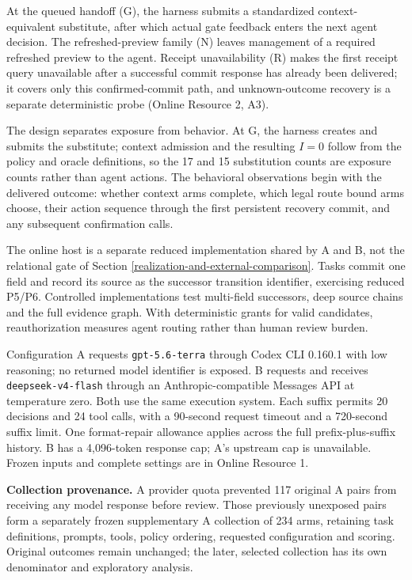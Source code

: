 At the queued handoff (G), the harness submits a standardized context-equivalent substitute, after which actual gate feedback enters the next agent decision. The refreshed-preview family (N) leaves management of a required refreshed preview to the agent. Receipt unavailability (R) makes the first receipt query unavailable after a successful commit response has already been delivered; it covers only this confirmed-commit path, and unknown-outcome recovery is a separate deterministic probe (Online Resource 2, A3).

The design separates exposure from behavior. At G, the harness creates and submits the substitute; context admission and the resulting \(I=0\) follow from the policy and oracle definitions, so the 17 and 15 substitution counts are exposure counts rather than agent actions. The behavioral observations begin with the delivered outcome: whether context arms complete, which legal route bound arms choose, their action sequence through the first persistent recovery commit, and any subsequent confirmation calls.

The online host is a separate reduced implementation shared by A and B, not the relational gate of Section \ref{realization-and-external-comparison}. Tasks commit one field and record its source as the successor transition identifier, exercising reduced P5/P6. Controlled implementations test multi-field successors, deep source chains and the full evidence graph. With deterministic grants for valid candidates, reauthorization measures agent routing rather than human review burden.

Configuration A requests \texttt{gpt-5.6-terra} through Codex CLI 0.160.1 with low reasoning; no returned model identifier is exposed. B requests and receives \texttt{deepseek-v4-flash} through an Anthropic-compatible Messages API at temperature zero. Both use the same execution system. Each suffix permits 20 decisions and 24 tool calls, with a 90-second request timeout and a 720-second suffix limit. One format-repair allowance applies across the full prefix-plus-suffix history. B has a 4,096-token response cap; A's upstream cap is unavailable. Frozen inputs and complete settings are in Online Resource 1.

\textbf{Collection provenance.} A provider quota prevented 117 original A pairs from receiving any model response before review. Those previously unexposed pairs form a separately frozen supplementary A collection of 234 arms, retaining task definitions, prompts, tools, policy ordering, requested configuration and scoring. Original outcomes remain unchanged; the later, selected collection has its own denominator and exploratory analysis.

